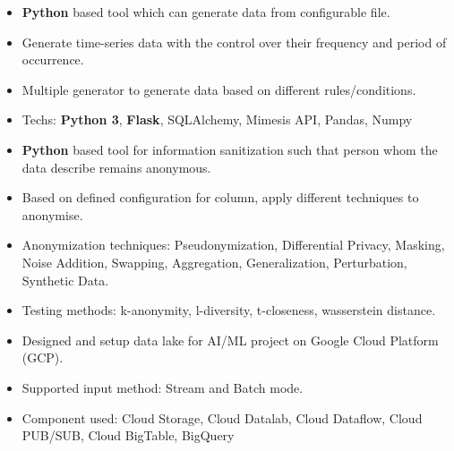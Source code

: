\documentclass[10pt,a4paper]{altacv}
\begin{document}

\begin{itemize}
  \item \small {\textbf {Python} based tool which can generate data from configurable file.}
  \item \small {Generate time-series data with the control over their frequency and period of occurrence.}
  \item \small {Multiple generator to generate data based on different rules/conditions.}
  \item \small {Techs: \textbf {Python 3}, \textbf {Flask}, SQLAlchemy, Mimesis API,  Pandas, Numpy}
\end{itemize}


%



\begin{itemize}
  \item \small {\textbf {Python} based tool for information sanitization such that person whom the data describe remains anonymous.}
  \item \small {Based on defined configuration for column, apply different techniques to anonymise.}
  \item \small {Anonymization techniques: Pseudonymization, Differential Privacy, Masking, Noise Addition, Swapping, Aggregation, Generalization, Perturbation, Synthetic Data.}
  \item \small {Testing methods: k-anonymity, l-diversity, t-closeness, wasserstein distance.}
\end{itemize}

%



\begin{itemize}
  \item \small {Designed and setup data lake for AI/ML project on Google Cloud Platform (GCP).}
  \item \small {Supported input method: Stream and Batch mode.}
  \item \small {Component used: Cloud Storage, Cloud Datalab, Cloud Dataflow, Cloud PUB/SUB, Cloud BigTable, BigQuery}
\end{itemize}
\end{document}
